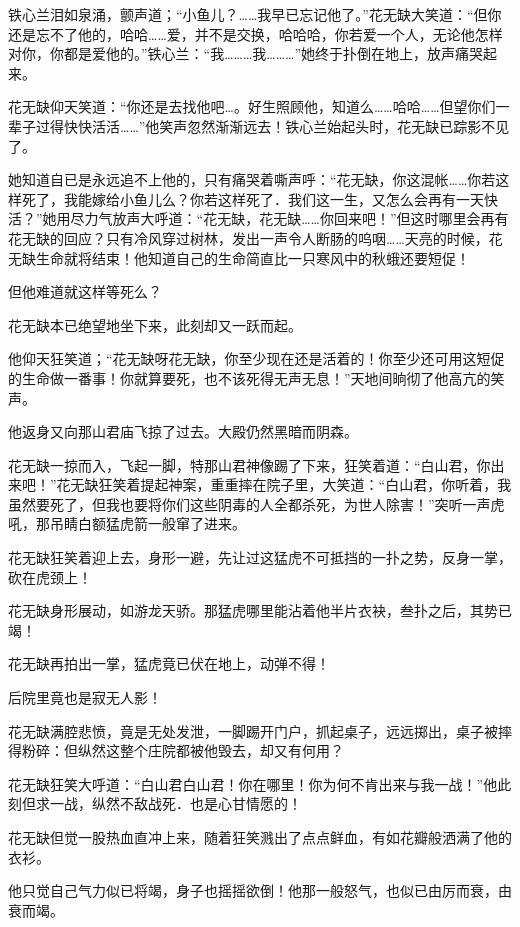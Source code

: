 \documentclass[12pt,oneside]{book}
\begin{document}
铁心兰泪如泉涌，颤声道；``小鱼儿？\ldots\ldots 我早已忘记他了。''花无缺大笑道：``但你还是忘不了他的，哈哈\ldots\ldots 爱，并不是交换，哈哈哈，你若爱一个人，无论他怎样对你，你都是爱他的。''铁心兰：``我\ldots\ldots\ldots 我\ldots\ldots\ldots{}''她终于扑倒在地上，放声痛哭起来。

花无缺仰天笑道：``你还是去找他吧\ldots。好生照顾他，知道么\ldots\ldots 哈哈\ldots\ldots 但望你们一辈子过得快快活活\ldots\ldots{}''他笑声忽然渐渐远去！铁心兰始起头时，花无缺已踪影不见了。

她知道自已是永远追不上他的，只有痛哭着嘶声呼：``花无缺，你这混帐\ldots\ldots 你若这样死了，我能嫁给小鱼儿么？你若这样死了．我们这一生，又怎么会再有一天快活？''她用尽力气放声大呼道：``花无缺，花无缺\ldots\ldots 你回来吧！''但这时哪里会再有花无缺的回应？只有冷风穿过树林，发出一声令人断肠的呜咽\ldots\ldots 天亮的时候，花无缺生命就将结束！他知道自己的生命简直比一只寒风中的秋蛾还要短促！

但他难道就这样等死么？

花无缺本已绝望地坐下来，此刻却又一跃而起。

他仰天狂笑道；``花无缺呀花无缺，你至少现在还是活着的！你至少还可用这短促的生命做一番事！你就算要死，也不该死得无声无息！''天地间晌彻了他高亢的笑声。

他返身又向那山君庙飞掠了过去。大殿仍然黑暗而阴森。

花无缺一掠而入，飞起一脚，特那山君神像踢了下来，狂笑着道：``白山君，你出来吧！''花无缺狂笑着提起神案，重重摔在院子里，大笑道：``白山君，你听着，我虽然要死了，但我也要将你们这些阴毒的人全都杀死，为世人除害！''突听一声虎吼，那吊睛白额猛虎箭一般窜了进来。

花无缺狂笑着迎上去，身形一避，先让过这猛虎不可抵挡的一扑之势，反身一掌，砍在虎颈上！

花无缺身形展动，如游龙天骄。那猛虎哪里能沾着他半片衣袂，叁扑之后，其势已竭！

花无缺再拍出一掌，猛虎竟已伏在地上，动弹不得！

后院里竟也是寂无人影！

花无缺满腔悲愤，竟是无处发泄，一脚踢开门户，抓起桌子，远远掷出，桌子被摔得粉碎：但纵然这整个庄院都被他毁去，却又有何用？

花无缺狂笑大呼道：``白山君白山君！你在哪里！你为何不肯出来与我一战！''他此刻但求一战，纵然不敌战死．也是心甘情愿的！

花无缺但觉一股热血直冲上来，随着狂笑溅出了点点鲜血，有如花瓣般洒满了他的衣衫。

他只觉自己气力似已将竭，身子也摇摇欲倒！他那一般怒气，也似已由厉而衰，由衰而竭。
\end{document}
